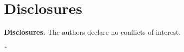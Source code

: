 \documentclass[9pt,twocolumn,twoside,pdftex]{optica}
\begin{document}



\section*{Disclosures}

\medskip

\noindent\textbf{Disclosures.} The authors declare no conflicts of interest.









˜
\end{document}
